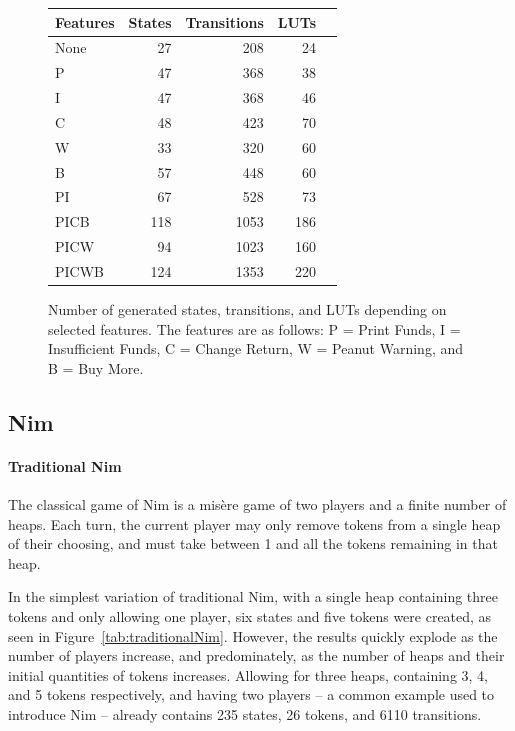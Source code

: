 \documentclass[sigplan,anonymous,review]{acmart}
\begin{document}
\begin{figure}
    \centering
\begin{tabular}{lrrrr}\toprule
Features &States &Transitions &LUTs \\\midrule
None &27 &208 &24 \\
P &47 &368 &38 \\
I &47 &368 &46 \\
C &48 &423 &70 \\
W &33 &320 &60 \\
B &57 &448 &60 \\
PI &67 &528 &73 \\
PICB &118 &1053 &186 \\
PICW &94 &1023 &160 \\
PICWB &124 &1353 &220 \\
\bottomrule
\end{tabular}
    \caption{Number of generated states, transitions, and LUTs depending on selected features. The features are as follows: P = Print Funds, I = Insufficient Funds, C = Change Return, W = Peanut Warning, and B = Buy More.}
    \label{fig:vmData}
\end{figure}

\subsection{Nim}\label{sec:nimresults}
\paragraph{Traditional Nim}
The classical game of Nim is a mis\`{e}re game of two players and a finite number of heaps. Each turn, the current player may only remove tokens from a single heap of their choosing, and must take between 1 and all the tokens remaining in that heap. 

In the simplest variation of traditional Nim, with a single heap containing three tokens and only allowing one player, six states and five tokens were created, as seen in Figure~\ref{tab:traditionalNim}. However, the results quickly explode as the number of players increase, and predominately, as the number of heaps and their initial quantities of tokens increases. Allowing for three heaps, containing 3, 4, and 5 tokens respectively, and having two players -- a common example used to introduce Nim -- already contains 235 states, 26 tokens, and 6110 transitions. 
\end{document}
